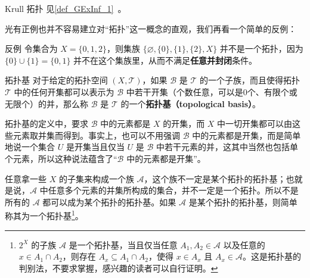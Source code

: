 \begin{example}{Krull 拓扑}
见\autoref{def_GExInf_1}~。
\end{example}

光有正例也并不容易建立对“拓扑”这一概念的直观，我们再看一个简单的反例：

\begin{example}{反例}
令集合为 $X=\{0, 1, 2\}$，则集族 $\{\varnothing, \{0\},\{1\},\{2\}, X\}$ 并不是一个拓扑，因为 $\{0\}\cup\{1\}=\{0,1\}$ 并不在这个集族里，从而不满足\textbf{任意并封闭}条件。
\end{example}

\begin{definition}{拓扑基}\label{def_Topol_2}
对于给定的拓扑空间 $(X, \mathcal{T})$，如果 $\mathcal{B}$ 是 $\mathcal{T}$ 的一个子族，而且使得拓扑 $\mathcal{T}$ 中的任何开集都可以表示为 $\mathcal{B}$ 中若干开集（个数任意，可以是0个、有限个或无限个）的并，那么称 $\mathcal{B}$ 是 $\mathcal{T}$ 的一个\textbf{拓扑基（topological basis）}。
\end{definition}

拓扑基的定义中，要求 $\mathcal{B}$ 中的元素都是 $X$ 的开集，而 $X$ 中一切开集都可以由这些元素取并集而得到。事实上，也可以不用强调
$\mathcal{B}$ 中的元素都是开集，而是简单地说一个集合 $U$ 是开集当且仅当 $U$ 是 $\mathcal{B}$ 中若干元素的并，这其中当然也包括单个元素，所以这种说法蕴含了“$\mathcal{B}$ 中的元素都是开集”。

任意拿一些 $X$ 的子集来构成一个族 $\mathcal{A}$，这个族不一定是某个拓扑的拓扑基；也就是说，$\mathcal{A}$ 中任意多个元素的并集所构成的集合，并不一定是一个拓扑。所以不是所有的 $\mathcal{A}$ 都可以成为某个拓扑的拓扑基。如果 $\mathcal{A}$ 是某个拓扑的拓扑基，则简单称其为一个拓扑基\footnote{$2^X$ 的子族 $\mathcal{A}$ 是一个拓扑基，当且仅当任意 $A_1, A_2\in\mathcal{A}$ 以及任意的 $x\in A_1\cap A_2$，则存在 $A_x\subseteq A_1\cap A_2$，使得 $x\in A_x$ 且 $A_x\in \mathcal{A}$。这是拓扑基的判别法，不要求掌握，感兴趣的读者可以自行证明。}。


